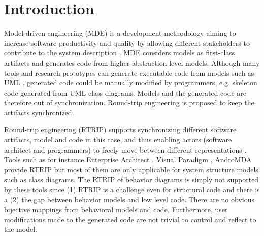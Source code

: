 

\section{Introduction}
\label{sec:introduction}
Model-driven engineering (MDE) is a development methodology aiming to increase software productivity and quality by allowing different stakeholders to contribute to the system description \cite{Mussbacher2014}. MDE considers models as first-class artifacts and generates code from higher abstraction level models. Although many tools and research prototypes can generate executable code from models such as UML \cite{Specification2007}, generated code could be manually modified by programmers, e.g. skeleton code generated from UML class diagrams. Models and the generated code are therefore out of synchronization. Round-trip engineering is proposed to keep the artifacts synchronized.

Round-trip engineering \cite{Aßmann200333} (RTRIP) supports synchronizing different software artifacts, model and code in this case, and thus enabling actors (software architect and programmers) to freely move between different representations \cite{Sendall}. Tools such as for instance Enterprise Architect \cite{sparxsystems_enterprise_2014}, Visual Paradigm \cite{visual}, AndroMDA \cite{_andromda_} provide RTRIP but most of them are only applicable for system structure models such as class diagrams. The RTRIP of behavior diagrams is simply not supported by these tools since (1) RTRIP is a challenge even for structural code and there is a (2) the gap between behavior models and low level code. There are no obvious bijective mappings from behavioral models and code. Furthermore, user modifications made to the generated code are not trivial to control and reflect to the model.

